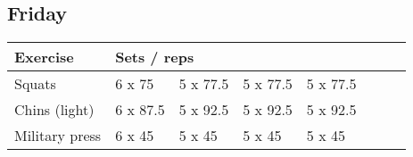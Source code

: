 \documentclass[12pt, a4paper]{article}%
\begin{document}
  \subsection*{\hspace{0.5em} Friday }


  \begin{tabular}{l|lllllll}
  \hspace{0.75em} \textbf{Exercise} & \multicolumn{ 7 }{l}{ \textbf{Sets / reps} } \\ \hline

            \hspace{0.75em} Squats
            & 6 x 75
            & 5 x 77.5
            & 5 x 77.5
            & 5 x 77.5
            & 
            & 
            & 
            \\


            \hspace{0.75em} Chins (light)
            & 6 x 87.5
            & 5 x 92.5
            & 5 x 92.5
            & 5 x 92.5
            & 
            & 
            & 
            \\


            \hspace{0.75em} Military press
            & 6 x 45
            & 5 x 45
            & 5 x 45
            & 5 x 45
            & 
            & 
            & 
            \\


  \end{tabular}
\end{document}
